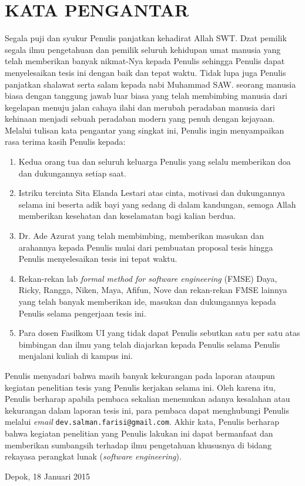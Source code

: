 \chapter*{KATA PENGANTAR}
\noindent
Segala puji dan syukur Penulis panjatkan kehadirat Allah SWT. Dzat pemilik segala ilmu pengetahuan dan pemilik seluruh kehidupan umat manusia yang telah memberikan banyak nikmat-Nya kepada Penulis sehingga Penulis dapat menyelesaikan tesis ini dengan baik dan tepat waktu. Tidak lupa juga Penulis panjatkan shalawat serta salam kepada nabi Muhammad SAW. seorang manusia biasa dengan tanggung jawab luar biasa yang telah membimbing manusia dari kegelapan menuju jalan cahaya ilahi dan merubah peradaban manusia dari kehinaan menjadi sebuah peradaban modern yang penuh dengan kejayaan.\\

\noindent
Melalui tulisan kata pengantar yang singkat ini, Penulis ingin menyampaikan rasa terima kasih Penulis kepada:

\begin{enumerate}
    \item Kedua orang tua dan seluruh keluarga Penulis yang selalu memberikan doa dan dukungannya setiap saat.
    \item Istriku tercinta Sita Elanda Lestari atas cinta, motivasi dan dukungannya selama ini beserta adik bayi yang sedang di dalam kandungan, semoga Allah memberikan kesehatan dan keselamatan bagi kalian berdua.
    \item Dr. Ade Azurat yang telah membimbing, memberikan masukan dan arahannya kepada Penulis mulai dari pembuatan proposal tesis hingga Penulis menyelesaikan tesis ini tepat waktu.
    \item Rekan-rekan lab \textit{formal method for software engineering} (FMSE) Daya, Ricky, Rangga, Niken, Maya, Afifun, Nove dan rekan-rekan FMSE lainnya yang telah banyak memberikan ide, masukan dan dukungannya kepada Penulis selama pengerjaan tesis ini.
    \item Para dosen Fasilkom UI yang tidak dapat Penulis sebutkan satu per satu atas bimbingan dan ilmu yang telah diajarkan kepada Penulis selama Penulis menjalani kuliah di kampus ini.
\end{enumerate}

\noindent
Penulis menyadari bahwa masih banyak kekurangan pada laporan ataupun kegiatan penelitian tesis yang Penulis kerjakan selama ini. Oleh karena itu, Penulis berharap apabila pembaca sekalian menemukan adanya kesalahan atau kekurangan dalam laporan tesis ini, para pembaca dapat menghubungi Penulis melalui \textit{email} \texttt{dev.salman.farisi@gmail.com}. Akhir kata, Penulis berharap bahwa kegiatan penelitian yang Penulis lakukan ini dapat bermanfaat dan memberikan sumbangsih terhadap ilmu pengetahuan khususnya di bidang rekayasa perangkat lunak (\textit{software engineering}).

\vspace*{0.1cm}
\begin{flushright}
Depok, 18 Januari 2015\\[0.1cm]
\vspace*{1cm}
\penulis

\end{flushright}